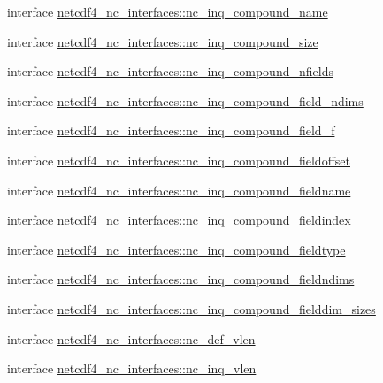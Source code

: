 \begin{DoxyCompactItemize}
\item 
interface \hyperlink{interfacenetcdf4__nc__interfaces_1_1nc__inq__compound__name}{netcdf4\+\_\+nc\+\_\+interfaces\+::nc\+\_\+inq\+\_\+compound\+\_\+name}
\item 
interface \hyperlink{interfacenetcdf4__nc__interfaces_1_1nc__inq__compound__size}{netcdf4\+\_\+nc\+\_\+interfaces\+::nc\+\_\+inq\+\_\+compound\+\_\+size}
\item 
interface \hyperlink{interfacenetcdf4__nc__interfaces_1_1nc__inq__compound__nfields}{netcdf4\+\_\+nc\+\_\+interfaces\+::nc\+\_\+inq\+\_\+compound\+\_\+nfields}
\item 
interface \hyperlink{interfacenetcdf4__nc__interfaces_1_1nc__inq__compound__field__ndims}{netcdf4\+\_\+nc\+\_\+interfaces\+::nc\+\_\+inq\+\_\+compound\+\_\+field\+\_\+ndims}
\item 
interface \hyperlink{interfacenetcdf4__nc__interfaces_1_1nc__inq__compound__field__f}{netcdf4\+\_\+nc\+\_\+interfaces\+::nc\+\_\+inq\+\_\+compound\+\_\+field\+\_\+f}
\item 
interface \hyperlink{interfacenetcdf4__nc__interfaces_1_1nc__inq__compound__fieldoffset}{netcdf4\+\_\+nc\+\_\+interfaces\+::nc\+\_\+inq\+\_\+compound\+\_\+fieldoffset}
\item 
interface \hyperlink{interfacenetcdf4__nc__interfaces_1_1nc__inq__compound__fieldname}{netcdf4\+\_\+nc\+\_\+interfaces\+::nc\+\_\+inq\+\_\+compound\+\_\+fieldname}
\item 
interface \hyperlink{interfacenetcdf4__nc__interfaces_1_1nc__inq__compound__fieldindex}{netcdf4\+\_\+nc\+\_\+interfaces\+::nc\+\_\+inq\+\_\+compound\+\_\+fieldindex}
\item 
interface \hyperlink{interfacenetcdf4__nc__interfaces_1_1nc__inq__compound__fieldtype}{netcdf4\+\_\+nc\+\_\+interfaces\+::nc\+\_\+inq\+\_\+compound\+\_\+fieldtype}
\item 
interface \hyperlink{interfacenetcdf4__nc__interfaces_1_1nc__inq__compound__fieldndims}{netcdf4\+\_\+nc\+\_\+interfaces\+::nc\+\_\+inq\+\_\+compound\+\_\+fieldndims}
\item 
interface \hyperlink{interfacenetcdf4__nc__interfaces_1_1nc__inq__compound__fielddim__sizes}{netcdf4\+\_\+nc\+\_\+interfaces\+::nc\+\_\+inq\+\_\+compound\+\_\+fielddim\+\_\+sizes}
\item 
interface \hyperlink{interfacenetcdf4__nc__interfaces_1_1nc__def__vlen}{netcdf4\+\_\+nc\+\_\+interfaces\+::nc\+\_\+def\+\_\+vlen}
\item 
interface \hyperlink{interfacenetcdf4__nc__interfaces_1_1nc__inq__vlen}{netcdf4\+\_\+nc\+\_\+interfaces\+::nc\+\_\+inq\+\_\+vlen}

\end{DoxyCompactItemize}
